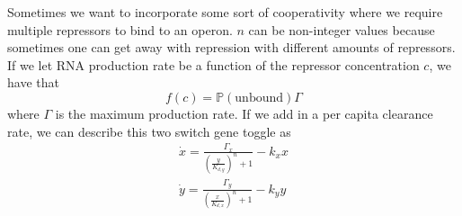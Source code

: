 \documentclass{article}
\newcommand{\p}{\mathbb{P}}
\begin{document}
Sometimes we want to incorporate some sort of cooperativity where we require multiple repressors to bind to an operon. $n$ can be non-integer values because sometimes one can get away with repression with different amounts of repressors. If we let RNA production rate be a function of the repressor concentration $c$, we have that 
\begin{equation*}
    f(c)=\p (\text{unbound})\Gamma
\end{equation*}
where $\Gamma$ is the maximum production rate. If we add in a per capita clearance rate, we can describe this two switch gene toggle as 
\begin{equation*}
    \begin{split}
        \dot x = \frac{\Gamma_x}{\left(\frac{y}{K_{d,y}}\right)^n+1}-k_xx \\
        \dot y =\frac{\Gamma_y}{\left(\frac{x}{K_{d,x}}\right)^n+1}-k_yy 
    \end{split}
\end{equation*} 
\end{document}
